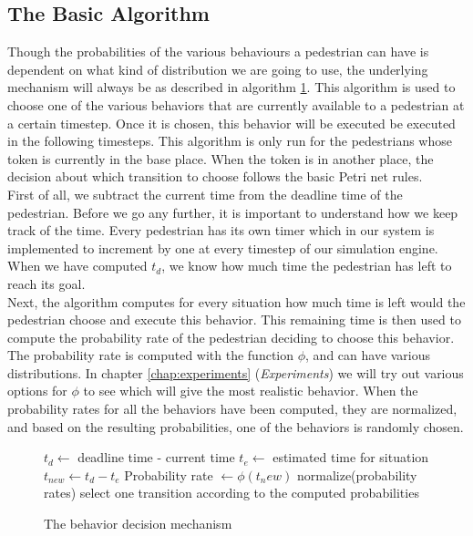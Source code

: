 \documentclass[11pt]{book}
\begin{document}
\subsection{The Basic Algorithm}
Though the probabilities of the various behaviours a pedestrian can have is dependent on what kind of distribution we are going to use, the underlying mechanism will always be as described in algorithm \ref{decisionmechanism}. This algorithm is used to choose one of the various behaviors that are currently available to a pedestrian at a certain timestep. Once it is chosen, this behavior will be executed be executed in the following timesteps. This algorithm is only run for the pedestrians whose token is currently in the base place. When the token is in another place, the decision about which transition to choose follows the basic Petri net rules.\\
First of all, we subtract the current time from the deadline time of the pedestrian.  Before we go any further, it is important to understand how we keep track of the time.  Every pedestrian has its own timer which in our system is implemented to increment by one at every timestep of our simulation engine. When we have computed $t_d$, we know how much time the pedestrian has left to reach its goal.\\
Next, the algorithm computes for every situation how much time is left would the pedestrian choose and execute this behavior. This remaining time is then used to compute the probability rate of the pedestrian deciding to choose this behavior. The probability rate is computed with the function $\phi$, and can have various distributions. In chapter \ref{chap:experiments} (\emph{Experiments}) we will try out various options for $\phi$ to see which will give the most realistic behavior. When the probability rates for all the behaviors have been computed, they are normalized, and based on the resulting probabilities, one of the behaviors is randomly chosen.

\begin{figure}
\begin{algorithm}
\caption{The behavior decision mechanism}
\label{decisionmechanism}
\begin{algorithmic}
\State $t_d \gets $ deadline time - current time 
\State $t_e \gets $ estimated time for situation
\State $t_{new} \gets t_d - t_e$
\State Probability rate $\gets \phi(t_new)$
\EndFor
\State normalize(probability rates)
\State select one transition according to the computed probabilities
\end{algorithmic}
\end{algorithm}
\end{figure}
\end{document}
